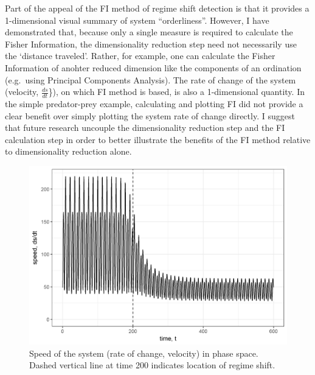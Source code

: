 \documentclass[12pt,twoside,openany]{reedthesis}
\begin{document}
Part of the appeal of the FI method of regime shift detection is that it provides a 1-dimensional visual summary of system ``orderliness''. However, I have demonstrated that, because only a single measure is required to calculate the Fisher Information, the dimensionality reduction step need not necessarily use the `distance traveled'. Rather, for example, one can calculate the Fisher Information of anohter reduced dimension like the components of an ordination (e.g.~using Principal Components Analysis). The rate of change of the system (velocity, \(\frac{ds}{dt}\)\}), on which FI method is based, is also a 1-dimensional quantity. In the simple predator-prey example, calculating and plotting FI did not provide a clear benefit over simply plotting the system rate of change directly. I suggest that future research uncouple the dimensionality reduction step and the FI calculation step in order to better illustrate the benefits of the FI method relative to dimensionality reduction alone.
\begin{figure}[bth]

{\centering \includegraphics[width=0.95\linewidth]{./chapterFiles/fiGuide/figures/dsdtOverTime} 

}

\caption{Speed of the system (rate of change, velocity) in phase space. Dashed vertical line at time 200 indicates location of regime shift.}\label{fig:dsdtOverTime}
\end{figure}
\end{document}
